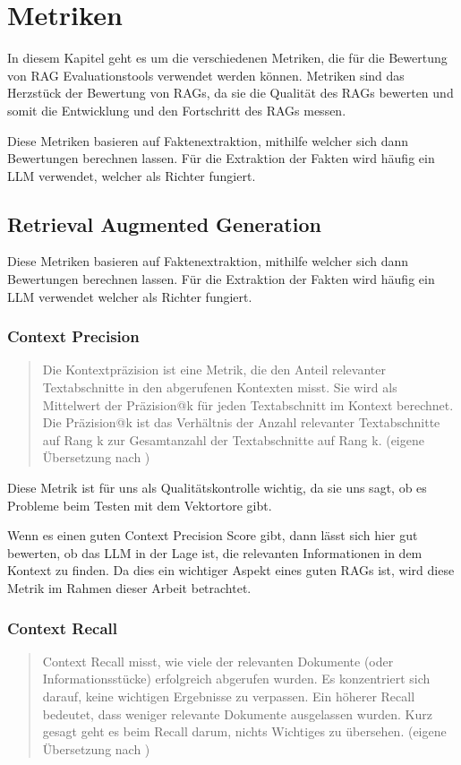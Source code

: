 \section{Metriken}

\label{chap:formal}
In diesem Kapitel geht es um die verschiedenen Metriken, die für die Bewertung von RAG Evaluationstools verwendet werden können.
Metriken sind das Herzstück der Bewertung von RAGs, da sie die Qualität des RAGs bewerten und somit die Entwicklung und den Fortschritt des RAGs messen.

Diese Metriken basieren auf Faktenextraktion, mithilfe welcher sich dann Bewertungen berechnen lassen.
Für die Extraktion der Fakten wird häufig ein LLM verwendet, welcher als Richter fungiert.

\subsection{Retrieval Augmented Generation}
Diese Metriken basieren auf Faktenextraktion, mithilfe welcher sich dann Bewertungen berechnen lassen.
Für die Extraktion der Fakten wird häufig ein LLM verwendet welcher als Richter fungiert.


\subsubsection{Context Precision}
\begin{quote}
Die Kontextpräzision ist eine Metrik, die den Anteil relevanter Textabschnitte in den abgerufenen Kontexten misst.
Sie wird als Mittelwert der Präzision@k für jeden Textabschnitt im Kontext berechnet.
Die Präzision@k ist das Verhältnis der Anzahl relevanter Textabschnitte auf Rang k zur Gesamtanzahl der Textabschnitte auf Rang k.
(eigene Übersetzung nach \cite{ragas_context_precision})
\end{quote}
Diese Metrik ist für uns als Qualitätskontrolle wichtig, da sie uns sagt, ob es Probleme beim Testen mit dem Vektortore gibt.

Wenn es einen guten Context Precision Score gibt, dann lässt sich hier gut bewerten, ob das LLM in der Lage ist, die relevanten Informationen in dem Kontext zu finden.
Da dies ein wichtiger Aspekt eines guten RAGs ist, wird diese Metrik im Rahmen dieser Arbeit betrachtet.

\subsubsection{Context Recall}
\begin{quote}
Context Recall misst, wie viele der relevanten Dokumente (oder Informationsstücke) erfolgreich abgerufen wurden.
Es konzentriert sich darauf, keine wichtigen Ergebnisse zu verpassen.
Ein höherer Recall bedeutet, dass weniger relevante Dokumente ausgelassen wurden.
Kurz gesagt geht es beim Recall darum, nichts Wichtiges zu übersehen.
(eigene Übersetzung nach \cite{ragas_context_recall})
\end{quote}

